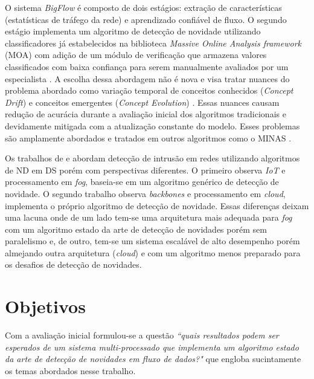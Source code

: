 O sistema \emph{BigFlow} é composto de dois estágios: extração de
características (estatísticas de tráfego da rede) e aprendizado confiável de
fluxo. O segundo estágio implementa um algoritmo de detecção de novidade
utilizando classificadores já estabelecidos na biblioteca \emph{Massive Online Analysis framework} (MOA) \cite{MOA} com
adição de um módulo de verificação que armazena valores classificados com baixa
confiança para serem manualmente avaliados por um especialista \cite{Viegas2019}.
A escolha dessa
abordagem não é nova e visa tratar nuances do problema abordado como
variação temporal de conceitos conhecidos (\emph{Concept Drift}) e
conceitos emergentes (\emph{Concept Evolution})
\cite{Faria2016nd}.
Essas nuances causam redução de acurácia durante a
avaliação inicial dos algoritmos tradicionais e devidamente mitigada com a
atualização constante do modelo. Esses problemas são amplamente abordados e
tratados em outros algoritmos como o MINAS \cite{Faria2016minas}.

Os trabalhos de  e  abordam
detecção de intrusão em redes utilizando algoritmos de ND em DS porém com
perspectivas diferentes.
O primeiro observa \emph{IoT} e processamento em \emph{fog}, baseia-se em um
algoritmo genérico de detecção de novidade.
O segundo trabalho observa \emph{backbones} e
processamento em \emph{cloud}, implementa o próprio algoritmo de detecção de
novidade. Essas diferenças deixam uma lacuna onde de um lado tem-se uma
arquitetura mais adequada para \emph{fog} com um algoritmo estado da arte de
detecção de novidades porém sem paralelismo e, de outro, tem-se um sistema
escalável de alto desempenho porém almejando outra arquitetura (\emph{cloud}) e
com um algoritmo menos preparado para os desafios de detecção de novidades.


\section{Objetivos}
\label{sec:objetivos}

Com a avaliação inicial formulou-se a questão \emph{``quais resultados podem
ser esperados de um sistema multi-processado que implementa um algoritmo estado
da arte de detecção de novidades em fluxo de dados?"} que engloba sucintamente
os temas abordados nesse trabalho.

